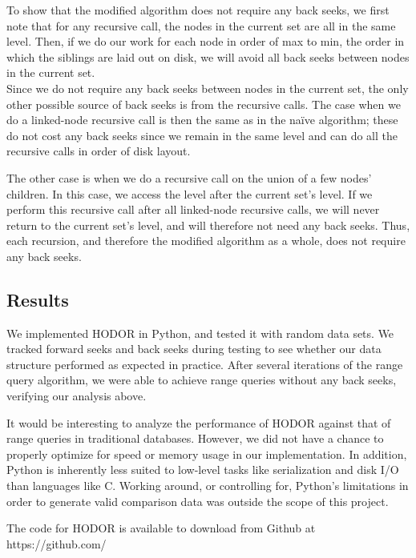 \documentclass[11pt, oneside]{article}
\begin{document}
To show that the modified algorithm does not require any back seeks, we first
note that for any recursive call, the nodes in the current set are all in the
same level. Then, if we do our work for each node in order of max to min, the
order in which the siblings are laid out on disk, we will avoid all back seeks
between nodes in the current set. \\

Since we do not require any back seeks between nodes in the current set, the
only other possible source of back seeks is from the recursive calls.  The case
when we do a linked-node recursive call is then the same as in the na{\"i}ve
algorithm; these do not cost any back seeks since we remain in the same level
and can do all the recursive calls in order of disk layout. 

The other case is when we do a recursive call on the union of a few nodes'
children. In this case, we access the level after the current set's level. If we
perform this recursive call after all linked-node recursive calls, we will never
return to the current set's level, and will therefore not need any back seeks.
Thus, each recursion, and therefore the modified algorithm as a whole, does not
require any back seeks.

\subsection{Results}

We implemented HODOR in Python, and tested it with random data sets. We tracked
forward seeks and back seeks during testing to see whether our data structure
performed as expected in practice. After several iterations of the range query
algorithm, we were able to achieve range queries without any back seeks,
verifying our analysis above. 

It would be interesting to analyze the performance of HODOR against that of
range queries in traditional databases. However, we did not have a chance to
properly optimize for speed or memory usage in our implementation. In addition,
Python is inherently less suited to low-level tasks like serialization and
disk I/O than languages like C. Working around, or controlling for, Python's
limitations in order to generate valid comparison data was outside the scope of
this project. 

The code for HODOR is available to download from Github at
https://github.com/%
\end{document}
